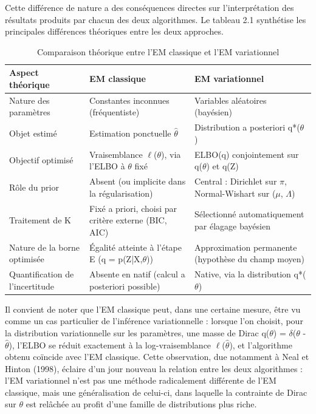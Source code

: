 Cette différence de nature a des conséquences directes sur l'interprétation des résultats produits par chacun des deux algorithmes. Le tableau 2.1 synthétise les principales différences théoriques entre les deux approches.

\begin{table}[H]
\centering
\small
\setlength{\tabcolsep}{0.14cm}
\begin{tabular}{|p{4.84cm}|p{4.84cm}|p{4.84cm}|}
\hline
\textbf{Aspect théorique} & \textbf{EM classique} & \textbf{EM variationnel} \\
\hline
Nature des paramètres & Constantes inconnues (fréquentiste) & Variables aléatoires (bayésien) \\
\hline
Objet estimé & Estimation ponctuelle $\hat{\theta }$ & Distribution a posteriori q*($\theta $) \\
\hline
Objectif optimisé & Vraisemblance $\ell $($\theta $), via l'ELBO à $\theta $ fixé & ELBO(q) conjointement sur q($\theta $) et q(Z) \\
\hline
Rôle du prior & Absent (ou implicite dans la régularisation) & Central : Dirichlet sur $\pi $, Normal-Wishart sur ($\mu $, $\Lambda $) \\
\hline
Traitement de K & Fixé a priori, choisi par critère externe (BIC, AIC) & Sélectionné automatiquement par élagage bayésien \\
\hline
Nature de la borne optimisée & Égalité atteinte à l'étape E (q = p(Z|X,$\theta $)) & Approximation permanente (hypothèse du champ moyen) \\
\hline
Quantification de l'incertitude & Absente en natif (calcul a posteriori possible) & Native, via la distribution q*($\theta $) \\
\hline
\end{tabular}
\caption{Comparaison théorique entre l'EM classique et l'EM variationnel}
\label{tab:2_1}
\end{table}
Il convient de noter que l'EM classique peut, dans une certaine mesure, être vu comme un cas particulier de l'inférence variationnelle : lorsque l'on choisit, pour la distribution variationnelle sur les paramètres, une masse de Dirac q($\theta $) = $\delta $($\theta $ - $\hat{\theta }$), l'ELBO se réduit exactement à la log-vraisemblance $\ell $($\hat{\theta }$), et l'algorithme obtenu coïncide avec l'EM classique. Cette observation, due notamment à Neal et Hinton (1998), éclaire d'un jour nouveau la relation entre les deux algorithmes : l'EM variationnel n'est pas une méthode radicalement différente de l'EM classique, mais une généralisation de celui-ci, dans laquelle la contrainte de Dirac sur $\theta $ est relâchée au profit d'une famille de distributions plus riche.

